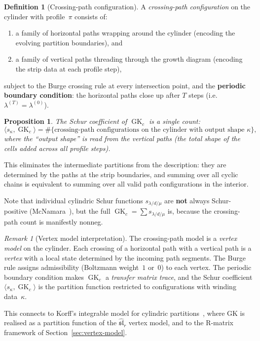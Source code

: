 \documentclass[11pt]{article}
\theoremstyle{plain}
\newtheorem{proposition}[theorem]{Proposition}
\theoremstyle{definition}
\newtheorem{definition}[theorem]{Definition}
\theoremstyle{remark}
\newtheorem{remark}[theorem]{Remark}
\newcommand{\GK}{\operatorname{GK}}
\begin{document}
\begin{definition}[Crossing-path configuration]
\label{def:crossing-config}
A \emph{crossing-path configuration} on the cylinder with
profile~$\pi$ consists of:
\begin{enumerate}
\item a family of horizontal paths wrapping around the cylinder
  (encoding the evolving partition boundaries), and
\item a family of vertical paths threading through the growth
  diagram (encoding the strip data at each profile step),
\end{enumerate}
subject to the Burge crossing rule at every intersection point,
and the \textbf{periodic boundary condition}: the horizontal paths
close up after $T$ steps (i.e.\ $\lambda^{(T)} = \lambda^{(0)}$).
\end{definition}

\begin{proposition}\label{prop:crossing-schur}
The Schur coefficient of $\GK_c$ is a \emph{single count}:
\[
  \langle s_\kappa, \GK_c \rangle
  = \#\bigl\{\text{crossing-path configurations on the cylinder
    with output shape } \kappa \bigr\},
\]
where the ``output shape'' is read from the vertical paths
(the total shape of the cells added across all profile steps).
\end{proposition}

This eliminates the intermediate partitions from the
description: they are determined by the paths at the strip
boundaries, and summing over all cyclic chains is equivalent to
summing over all valid path configurations in the interior.

Note that individual cylindric Schur functions $s_{\lambda/d/\mu}$
are \textbf{not} always Schur-positive
(McNamara~\cite{mcnamara-2006}), but the full
$\GK_c = \sum s_{\lambda/d/\mu}$ is, because the crossing-path
count is manifestly nonneg.

\begin{remark}[Vertex model interpretation]
\label{rem:vertex-model-paths}
The crossing-path model is a \emph{vertex model} on the cylinder.
Each crossing of a horizontal path with a vertical path is a
\emph{vertex} with a local state determined by the incoming path
segments.  The Burge rule assigns admissibility (Boltzmann
weight~$1$ or~$0$) to each vertex.  The periodic boundary condition
makes $\GK_c$ a \emph{transfer matrix trace}, and the Schur
coefficient $\langle s_\kappa, \GK_c \rangle$ is the
partition function restricted to configurations with winding
data~$\kappa$.

This connects to Korff's integrable model for cylindric
partitions~\cite{korff-2011}, where GK is realised as a partition
function of the $\widehat{\mathfrak{sl}}_r$ vertex model, and to
the R-matrix framework of Section~\ref{sec:vertex-model}.
\end{remark}
\end{document}
